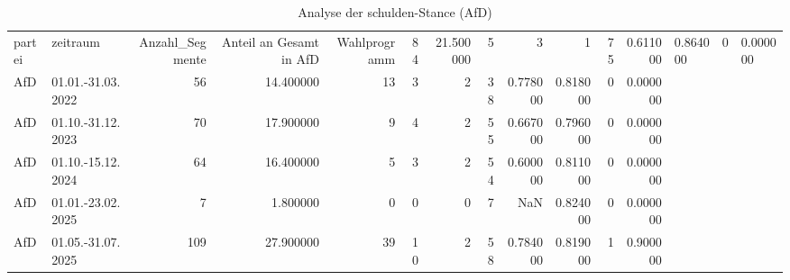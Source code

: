 \begin{table}
\caption{Analyse der schulden-Stance (AfD)}
\label{tab:meine_tabelle}
\begin{tabular}{llrrrrrrrrrr}
\toprule
partei & zeitraum & Anzahl_Segmente & Anteil an Gesamt in %
\midrule
AfD & Wahlprogramm & 84 & 21.500000 & 5 & 3 & 1 & 75 & 0.611000 & 0.864000 & 0 & 0.000000 \\
AfD & 01.01.-31.03.2022 & 56 & 14.400000 & 13 & 3 & 2 & 38 & 0.778000 & 0.818000 & 0 & 0.000000 \\
AfD & 01.10.-31.12.2023 & 70 & 17.900000 & 9 & 4 & 2 & 55 & 0.667000 & 0.796000 & 0 & 0.000000 \\
AfD & 01.10.-15.12.2024 & 64 & 16.400000 & 5 & 3 & 2 & 54 & 0.600000 & 0.811000 & 0 & 0.000000 \\
AfD & 01.01.-23.02.2025 & 7 & 1.800000 & 0 & 0 & 0 & 7 & NaN & 0.824000 & 0 & 0.000000 \\
AfD & 01.05.-31.07.2025 & 109 & 27.900000 & 39 & 10 & 2 & 58 & 0.784000 & 0.819000 & 1 & 0.900000 \\
\bottomrule
\end{tabular}
\end{table}
